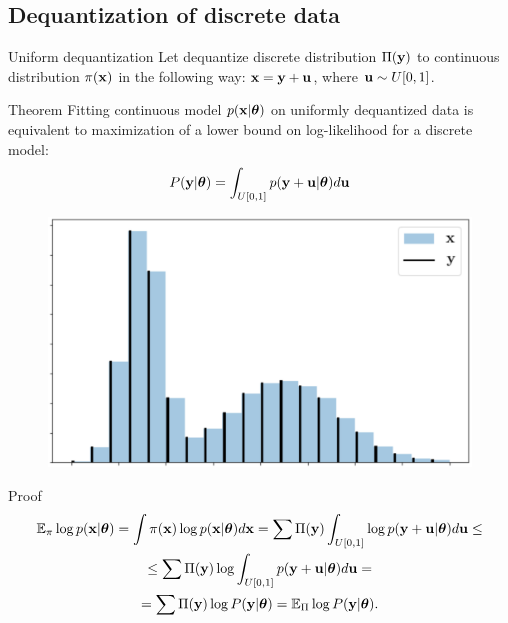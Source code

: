 \subsection{Dequantization of discrete data}
\begin{frame}{Uniform dequantization}
	Let dequantize discrete distribution $\Pi(\mathbf{y})$ to continuous distribution $\pi(\mathbf{x})$ in the following way: $\mathbf{x} = \mathbf{y} + \mathbf{u}$, where  $\mathbf{u} \sim U[0, 1]$.
	\begin{minipage}{0.7\linewidth}	
		\begin{block}{Theorem}
			Fitting continuous model $p(\mathbf{x} | \boldsymbol{\theta})$ on uniformly dequantized data is equivalent to maximization of a lower bound on log-likelihood for a discrete model:
			\vspace{-0.2cm}
			\[
			P(\mathbf{y} | \boldsymbol{\theta}) = \int_{U[0, 1]} p(\mathbf{y} + \mathbf{u} | \boldsymbol{\theta}) d \mathbf{u}
			\]
			\vspace{-0.5cm} 
		\end{block}
	\end{minipage}%
	\begin{minipage}{0.3\linewidth}
		\begin{figure}
			\centering
			\includegraphics[width=\linewidth,height=0.8\linewidth]{figs/uniform_dequantization.png}
		\end{figure}
	\end{minipage}

	\begin{block}{Proof}
		\vspace{-0.8cm}
		{\small
		\begin{multline*}
			\mathbb{E}_{\pi} \log p(\mathbf{x} | \boldsymbol{\theta}) = \int \pi(\mathbf{x}) \log p(\mathbf{x} | \boldsymbol{\theta}) d \mathbf{x} = \sum \Pi(\mathbf{y}) \int_{U[0,1]} \log p(\mathbf{y} + \mathbf{u} | \boldsymbol{\theta}) d \mathbf{u} \leq \\
			\leq \sum \Pi(\mathbf{y}) \log \int_{U[0,1]}  p(\mathbf{y} + \mathbf{u} | \boldsymbol{\theta}) d \mathbf{u} = \\ = \sum \Pi(\mathbf{y}) \log P(\mathbf{y} | \boldsymbol{\theta}) = \mathbb{E}_{\Pi} \log P(\mathbf{y} | \boldsymbol{\theta}).
		\end{multline*}
		}
	\end{block}
\end{frame}
